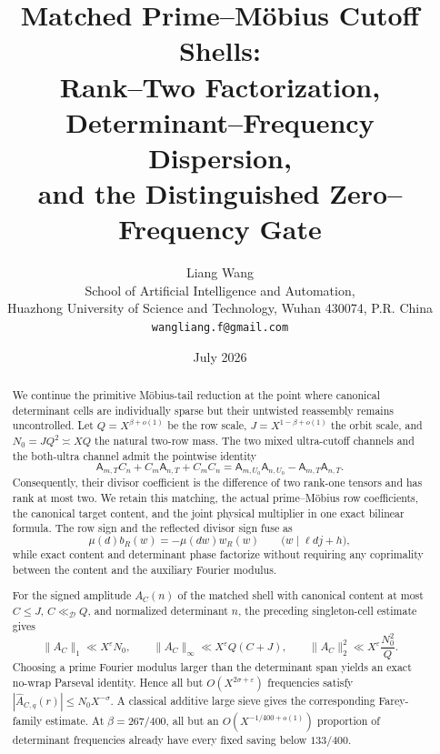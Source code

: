 \documentclass[11pt]{article}
\title{\textbf{Matched Prime--M\"obius Cutoff Shells:}\\
\textbf{Rank--Two Factorization, Determinant--Frequency Dispersion,}\\
\textbf{and the Distinguished Zero--Frequency Gate}}
\author{Liang Wang\\
\small School of Artificial Intelligence and Automation,\\[-0.2em]
\small Huazhong University of Science and Technology, Wuhan 430074, P.R. China\\
\small \texttt{wangliang.f@gmail.com}}
\date{July 2026}
\theoremstyle{definition}
\theoremstyle{remark}
\newcommand{\eps}{\varepsilon}
\begin{document}
\maketitle

\begin{abstract}
We continue the primitive M\"obius-tail reduction at the point where
canonical determinant cells are individually sparse but their untwisted
reassembly remains uncontrolled.  Let $Q=X^{\beta+o(1)}$ be the row scale,
$J=X^{1-\beta+o(1)}$ the orbit scale, and $N_0=JQ^2\asymp XQ$ the natural
two-row mass.  The two mixed ultra-cutoff channels and the both-ultra
channel admit the pointwise identity
\[
 \mathsf A_{m,T}C_n+C_m\mathsf A_{n,T}+C_mC_n
 =\mathsf A_{m,U_0}\mathsf A_{n,U_0}
  -\mathsf A_{m,T}\mathsf A_{n,T}.
\]
Consequently, their divisor coefficient is the difference of two rank-one
tensors and has rank at most two.  We retain this matching, the actual
prime--M\"obius row coefficients, the canonical target content, and the
joint physical multiplier in one exact bilinear formula.  The row sign and
the reflected divisor sign fuse as
\[
 \mu(d)b_R(w)=-\mu(dw)w_R(w)
 \qquad\bigl(w\mid \ell dj+h\bigr),
\]
while exact content and determinant phase factorize without requiring any
coprimality between the content and the auxiliary Fourier modulus.

For the signed amplitude $A_C(n)$ of the matched shell with canonical
content at most $C\le J$, $C\ll_{\mathscr D}Q$, and normalized determinant
$n$, the preceding
singleton-cell estimate gives
\[
 \|A_C\|_1\ll X^\eps N_0,
 \qquad
 \|A_C\|_\infty\ll X^\eps Q(C+J),
 \qquad
 \|A_C\|_2^2\ll X^\eps\frac{N_0^2}{Q}.
\]
Choosing a prime Fourier modulus larger than the determinant span yields an
exact no-wrap Parseval identity.  Hence all but
$O(X^{2\sigma+\eps})$ frequencies satisfy
$|\widehat A_{C,q}(r)|\le N_0X^{-\sigma}$.  A classical additive large sieve
gives the corresponding Farey-family estimate.  At $\beta=267/400$, all
but an $O(X^{-1/400+o(1)})$ proportion of determinant frequencies already
have every fixed saving below $133/400$.


\end{abstract}
\end{document}
